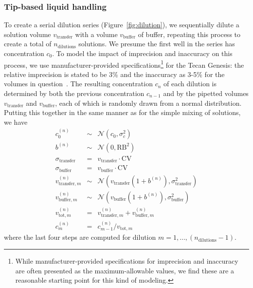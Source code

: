 \documentclass[aps,pre,twocolumn,nofootinbib,superscriptaddress,linenumbers]{revtex4-1}
\begin{document}
\subsubsection*{Tip-based liquid handling}

To create a serial dilution series (Figure~\ref{fig:dilution}), we sequentially dilute a solution volume $v_\mathrm{transfer}$ with a volume $v_\mathrm{buffer}$ of buffer, repeating this process to create a total of $n_\mathrm{dilutions}$ solutions. 
We presume the first well in the series has concentration $c_0$.
To model the impact of imprecision and inaccuracy on this process, we use manufacturer-provided specifications\footnote{While manufacturer-provided specifications for imprecision and inaccuracy are often presented as the maximum-allowable values, we find these are a reasonable starting point for this kind of modeling.} for the Tecan Genesis: the relative imprecision is stated to be 3\% and the inaccuracy as 3-5\% for the volumes in question~\cite{_tecan_2001}. 
The resulting concentration $c_n$ of each dilution is determined by both the previous concentration $c_{n-1}$  and by the pipetted volumes $v_\mathrm{transfer}$ and $v_\mathrm{buffer}$, each of which is randomly drawn from a normal distribution.
Putting this together in the same manner as for the simple mixing of solutions, we have
\begin{eqnarray}
c_0^{(n)} &\sim& \mathcal{N}(c_0, \sigma_c^2) \nonumber \label{equation:stock-concentration-uncertainty-simple} \\
b^{(n)} &\sim& \mathcal{N}(0, \mathrm{RB}^2) \nonumber \\
\sigma_\mathrm{transfer} &=& v_\mathrm{transfer} \cdot \mathrm{CV} \nonumber \\
\sigma_\mathrm{buffer} &=& v_\mathrm{buffer} \cdot \mathrm{CV} \nonumber \\
v_{\mathrm{transfer},m}^{(n)} &\sim& \mathcal{N}(v_\mathrm{transfer} (1 + b^{(n)}) , \sigma_\mathrm{transfer}^2) \nonumber \\
v_{\mathrm{buffer},m}^{(n)} &\sim& \mathcal{N}(v_\mathrm{buffer} (1 + b^{(n)}), \sigma_\mathrm{buffer}^2) \nonumber \\
v_{\mathrm{tot}, m}^{(n)} &=& v_{\mathrm{transfer}, m}^{(n)} + v_{\mathrm{buffer}, m}^{(n)} \nonumber \\
c_m^{(n)} &=& c_{m-1}^{(n)} / v_{\mathrm{tot}, m}
\end{eqnarray}
where the last four steps are computed for dilution $m = 1, \ldots, (n_\mathrm{dilutions}-1)$.
\end{document}
